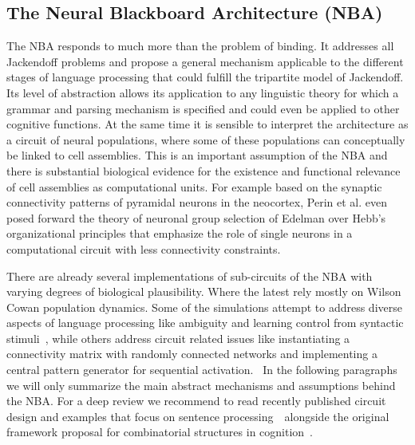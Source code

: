 \documentclass[10pt]{article}
\begin{document}
\subsection{The Neural Blackboard Architecture
(NBA)}

{\label{935508}}

The NBA responds to much more than the problem of binding. It addresses
all Jackendoff problems\cite{Jackendoff_2002b} and propose a general
mechanism applicable to the different stages of language processing that
could fulfill the tripartite model of Jackendoff\cite{Jackendoff_2002a}. Its
level of abstraction allows its application to any linguistic theory for
which a grammar and parsing mechanism is specified and could even be
applied to other cognitive functions. At the same time it is sensible to
interpret the architecture as a circuit of neural populations, where
some of these populations can conceptually be linked to cell assemblies.
This is an important assumption of the NBA and there is substantial
biological evidence for the existence and functional relevance of cell
assemblies as computational units\cite{Huyck_2013}. For example based
on the synaptic connectivity patterns of pyramidal neurons in the
neocortex, Perin et al.\cite{Perin_2011} even posed forward the theory
of neuronal group selection of Edelman\cite{edelman1987neural} over Hebb's
organizational principles\cite{hebb2005organization} that emphasize the role of
single neurons in a computational circuit with less connectivity
constraints.

There are already several implementations of sub-circuits of the NBA
with varying degrees of biological plausibility. Where the latest rely
mostly on Wilson Cowan population dynamics\cite{Destexhe_2009}. Some of
the simulations attempt to address diverse aspects of language
processing like ambiguity\cite{Frank_2014} and learning control from
syntactic stimuli~\cite{van_der_Velde_2010}, while others address circuit
related issues like instantiating a connectivity matrix with randomly
connected networks\cite{van_der_Velde_2011} and implementing a central pattern
generator for sequential activation\cite{van_Dijk_2015}. ~In the
following paragraphs we will only summarize the main abstract mechanisms
and assumptions behind the NBA. For a deep review we recommend to read
recently published circuit design and examples that focus on sentence
processing~\cite{de2015combinatorial}~alongside the original framework proposal
for combinatorial structures in cognition~\cite{van_der_Velde_2006}.
\end{document}
